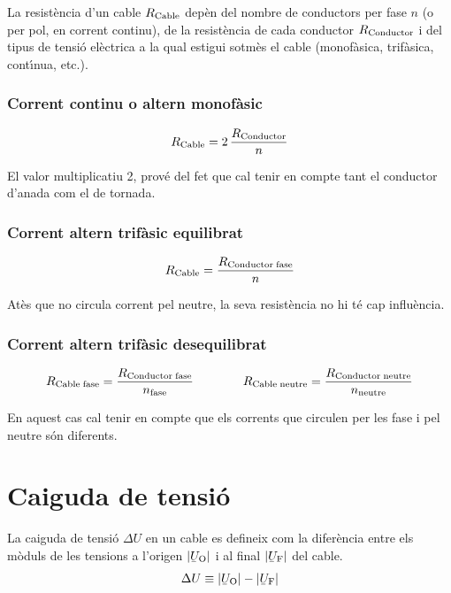 La resist\`{e}ncia d'un cable $R_\mathrm{Cable}$ dep\`{e}n del nombre de conductors per fase $n$ (o
per pol, en corrent continu), de la resist\`{e}ncia de cada conductor $R_\mathrm{Conductor}$ i del
tipus de tensi\'{o} el\`{e}ctrica a la qual estigui sotm\`{e}s el cable (monof\`{a}sica, trif\`{a}sica,
cont\'{\i}nua, etc.).

\subsubsection*{Corrent continu o altern monof\`{a}sic}
\begin{equation}\label{eq:r_cc_mono}
    R_\mathrm{Cable} = 2\, \frac{R_\mathrm{Conductor}}{n}
\end{equation}

El valor multiplicatiu 2, prov\'{e} del fet que cal tenir en compte tant el conductor d'anada
com el de tornada.

\subsubsection*{Corrent altern trif\`{a}sic equilibrat}
\vspace{-5mm}
\begin{equation}\label{eq:r_trifas}
R_\mathrm{Cable} = \frac{R_\mathrm{Conductor\;fase}}{n}
\end{equation}

At\`{e}s que no circula corrent pel neutre, la seva resist\`{e}ncia no hi t\'{e} cap influ\`{e}ncia.

\subsubsection*{Corrent altern trif\`{a}sic desequilibrat}
\begin{equation}
    R_\mathrm{Cable\;fase} = \frac{R_\mathrm{Conductor\;fase}}{n_\mathrm{fase}} \qquad\qquad
    R_\mathrm{Cable\; neutre} = \frac{R_\mathrm{Conductor\;neutre}}{n_\mathrm{neutre}}
\end{equation}

En aquest cas cal tenir en compte que els corrents que circulen per les fase i pel neutre
s\'{o}n diferents.


\section{Caiguda de tensi\'{o}}

La caiguda de tensi\'{o} $\Delta U$ en un cable es defineix com la difer\`{e}ncia entre els m\`{o}duls de les tensions a l'origen $|{\cmplx{U}\ped{O}}|$ i al final $|\cmplx{U}\ped{F}|$ del cable.
\begin{equation}
   \Delta U \equiv |\cmplx{U}\ped{O}| - |\cmplx{U}\ped{F}|
\end{equation}

